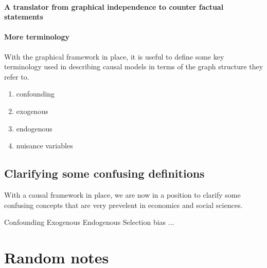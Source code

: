 \subsubsection{A translator from graphical independence to counter factual statements}

\subsubsection{More terminology}
With the graphical framework in place, it is useful to define some key terminology used in describing causal models in terms of the graph structure they refer to.

\begin{enumerate}
\item confounding
\item exogenous
\item endogenous
\item nuisance variables
\end{enumerate} 

\section{Clarifying some confusing definitions}

With a causal framework in place, we are now in a position to clarify some confusing concepts that are very prevelent in economics and social sciences.

Confounding
Exogenous
Endogenous
Selection bias
...

\chapter*{Random notes}



